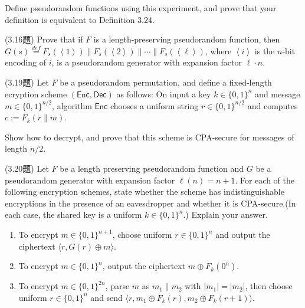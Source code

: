 \begin{questions}
        Define pseudorandom functions using this experiment, and prove that your definition is equivalent to Definition 3.24.

        \begin{solution}
        \end{solution}

    \question (3.16题) Prove that if $F$ is a length-preserving pseudorandom function, then $G(s)\overset{def}{=}F_s(\left\langle1\right\rangle)\parallel{F_s}(\left\langle2\right\rangle)\parallel\cdots\parallel{F_s}(\left\langle\ell\right\rangle)$, where $\left\langle{i}\right\rangle$ is the $n$-bit encoding of $i$, is a pseudorandom generator with expansion factor $\ell\cdot{n}$.

        \begin{solution}
        \end{solution}

    \question (3.19题) Let $F$ be a pseudorandom permutation, and define a fixed-length ecryption scheme $(\textsf{Enc},\textsf{Dec})$ as follows: On input a key $k\in\{0,1\}^n$ and message $m\in\{0,1\}^{n/2}$, algorithm $\textsf{Enc}$ chooses a uniform string $r\in\{0,1\}^{n/2}$ and computes $c:=F_k(r\parallel{m})$.

        Show how to decrypt, and prove that this scheme is CPA-secure for messages of length $n/2$.

        \begin{solution}
        \end{solution}

    \question(3.20题) Let $F$ be a length preserving pseudorandom function and $G$ be a pseudorandom generator with expansion factor $\ell(n)=n+1$. For each of the following encryption schemes, state whether the scheme has indistinguishable encryptions in the presence of an eavesdropper and whether it is CPA-secure.(In each case, the shared key is a uniform $k\in\{0,1\}^n$.) Explain your answer.

        \begin{enumerate}
            \item To encrypt $m\in\{0,1\}^{n+1}$, choose uniform $r\in\{0,1\}^n$ and output the ciphertext $\langle{r,G(r)\oplus{m}}\rangle$.
            \item To encrypt $m\in\{0,1\}^n$, output the ciphertext $m\oplus{F_k}(0^n)$.
            \item To encrypt $m\in\{0,1\}^{2n}$, parse $m$ as $\scriptstyle{m_1}\parallel{m_2}$ with $|m_1|=|m_2|$, then choose uniform $r\in\{0,1\}^n$ and send $\langle{r,m_1\oplus{F_k(r)},m_2\oplus{F_k(r+1)}}\rangle$.
        \end{enumerate}


\end{questions}
